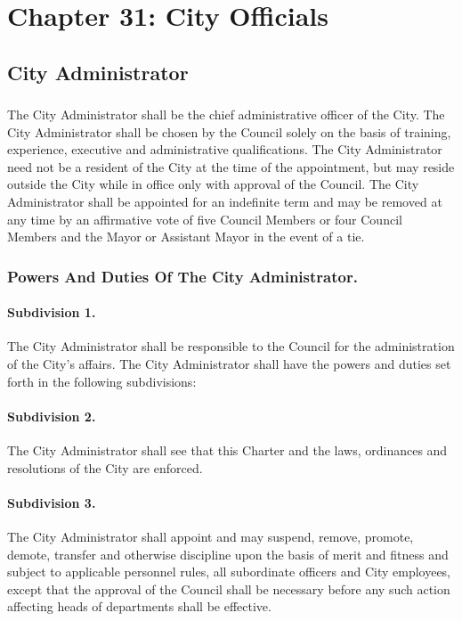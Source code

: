 \documentclass[code.tex]{subfiles}
\begin{document}
\chapter*{Chapter 31: \newline
	City Officials}

\section{City Administrator}
\subsection{}
The City Administrator shall be the chief administrative officer of the City. The City Administrator shall be chosen by the Council solely on the basis of training, experience, executive and administrative qualifications. The City Administrator need not be a resident of the City at the time of the appointment, but may reside outside the City while in office only with approval of the Council. The City Administrator shall be appointed for an indefinite term and may be removed at any time by an affirmative vote of five Council Members or four Council Members and the Mayor or Assistant Mayor in the event of a tie.
\subsection{Powers And Duties Of The City Administrator.}
\subsubsection*{Subdivision 1.}
The City Administrator shall be responsible to the Council for the administration of the City’s affairs. The City Administrator shall have the powers and duties set forth in the following subdivisions:
\subsubsection*{Subdivision 2.}
The City Administrator shall see that this Charter and the laws, ordinances and resolutions of the City are enforced.
\subsubsection*{Subdivision 3.}
The City Administrator shall appoint and may suspend, remove, promote, demote, transfer and otherwise discipline upon the basis of merit and fitness and subject to applicable personnel rules, all subordinate officers and City employees, except that the approval of the Council shall be necessary before any such action affecting heads of departments shall be effective.
\end{document}
